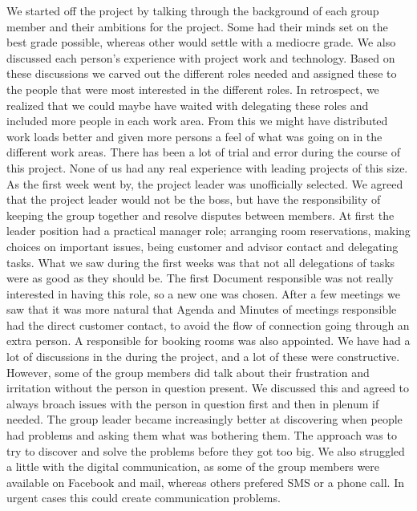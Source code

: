 We started off the project by talking through the background of each group member and their ambitions for the project. Some had their minds set on the best grade possible, whereas other would settle with a mediocre grade. We also discussed each person's experience with project work and technology. Based on these discussions we carved out the different roles needed and assigned these to the people that were most interested in the different roles. In retrospect, we realized that we could maybe have waited with delegating these roles and included more people in each work area. From this we might have distributed work loads better and given more persons a feel of what was going on in the different work areas. 
\newline
\newline
There has been a lot of trial and error during the course of this project. None of us had any real experience with leading projects of this size. As the first week went by, the project leader was unofficially selected. We agreed that the project leader would not be the boss, but have the responsibility of keeping the group together and resolve disputes between members. At first the leader position had a practical manager role; arranging room reservations, making choices on important issues, being customer and advisor contact and delegating tasks. What we saw during the first weeks was that not all delegations of tasks were as good as they should be. The first Document responsible was not really interested in having this role, so a new one was chosen. After a few meetings we saw that it was more natural that Agenda and Minutes of meetings responsible had the direct customer contact, to avoid the flow of connection going through an extra person. A responsible for booking rooms was also appointed.
\newline
\newline
We have had a lot of discussions in the during the project, and a lot of these were constructive. However, some of the group members did talk about their frustration and irritation without the person in question present. We discussed this and agreed to always broach issues with the person in question first and then in plenum if needed. The group leader became increasingly better at discovering when people had problems and asking them what was bothering them. The approach was to try to discover and solve the problems before they got too big. We also struggled a little with the digital communication, as some of the group members were available on Facebook and mail, whereas others prefered SMS or a phone call. In urgent cases this could create communication problems.
